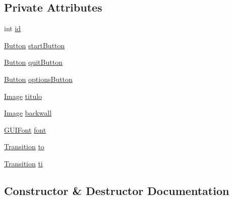 \subsection*{Private Attributes}
\begin{DoxyCompactItemize}
\item 
int \mbox{\hyperlink{classstates_1_1_main_menu_acdd02005ac38a76e9d4e5bca1e33fb4c}{id}}
\item 
\mbox{\hyperlink{classgui_1_1_button}{Button}} \mbox{\hyperlink{classstates_1_1_main_menu_a0b5fdbfec57ada5a6161f4b2dbc1bfe8}{start\+Button}}
\item 
\mbox{\hyperlink{classgui_1_1_button}{Button}} \mbox{\hyperlink{classstates_1_1_main_menu_ab0fc474be86201071427780c6c500dbb}{quit\+Button}}
\item 
\mbox{\hyperlink{classgui_1_1_button}{Button}} \mbox{\hyperlink{classstates_1_1_main_menu_a7e45c28d037c0d5daeb94b99ff83e81e}{options\+Button}}
\item 
\mbox{\hyperlink{classorg_1_1newdawn_1_1slick_1_1_image}{Image}} \mbox{\hyperlink{classstates_1_1_main_menu_a185de536bd7c3e47f5c7ade14b27dc84}{titulo}}
\item 
\mbox{\hyperlink{classorg_1_1newdawn_1_1slick_1_1_image}{Image}} \mbox{\hyperlink{classstates_1_1_main_menu_a0203042667da8aea22930eb0810d5d9d}{backwall}}
\item 
\mbox{\hyperlink{classgui_1_1_g_u_i_font}{G\+U\+I\+Font}} \mbox{\hyperlink{classstates_1_1_main_menu_a045edf02b97294df356a8101adaa11c3}{font}}
\item 
\mbox{\hyperlink{interfaceorg_1_1newdawn_1_1slick_1_1state_1_1transition_1_1_transition}{Transition}} \mbox{\hyperlink{classstates_1_1_main_menu_a7443336a416646891958e073289b2a50}{to}}
\item 
\mbox{\hyperlink{interfaceorg_1_1newdawn_1_1slick_1_1state_1_1transition_1_1_transition}{Transition}} \mbox{\hyperlink{classstates_1_1_main_menu_ab7c88b387c4beb4042ffd45d6b513c23}{ti}}
\end{DoxyCompactItemize}


\subsection{Constructor \& Destructor Documentation}
\mbox{\label{classstates_1_1_main_menu_adc73381b13644459bfc6502313f80241}} 
